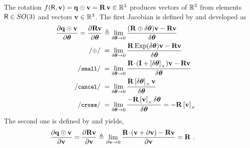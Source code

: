 The rotation $f(\mathsf R,{\bf v}) = {\bf q}\odot{\bf v} = {\bf R}\,{\bf v} \in {\mathbb R}^3$ produces vectors of ${\mathbb R}^3$ from elements $\mathsf R\in SO(3)$ and vectors ${\bf v}\in{\mathbb R}^3$. The first Jacobian is defined by  and developed as
%
\begin{align*}
\dpar{\bfq\od\bfv}{\bth} = \dpar{\bfR\bfv}{\bth} 
&\te \lim_{\delta\bth\to0}\frac{(\bfR\oplus\delta\bth)\bfv-\bfR\bfv}{\delta\bth} \\
\com{$\oplus$}
&= \lim_{\delta\bth\to0}\frac{\bfR\Exp(\delta\bth)\bfv-\bfR\bfv}{\delta\bth} \\
\csmall
&= \lim_{\delta\bth\to0}\frac{\bfR\tdot(\bfI+\hatx{\delta\bth})\bfv-\bfR\bfv}{\delta\bth} \\
\ccancel
&= \lim_{\delta\bth\to0}\frac{\bfR\hatx{\delta\bth}\bfv}{\delta\bth} \\
\ccross
&= \lim_{\delta\bth\to0}\frac{-\bfR\hatx{\bfv}\delta\bth}{\delta\bth} 
= -\bfR\hatx{\bfv} 
\end{align*}
%
The second one is defined by  and yields,
%
\begin{align*}
\frac{\partial{\bf q}\odot{\bf v}}{\partial{\bf v}} = \frac{\partial{\bf R}{\bf v}}{\partial{\bf v}} 
&\triangleq \lim_{\partial{\bf v}\to0}\frac{{\bf R}\!\cdot\!({\bf v}+\partial{\bf v})-{\bf R}{\bf v}}{\partial{\bf v}} 
= {\bf R}
~.
\end{align*}





